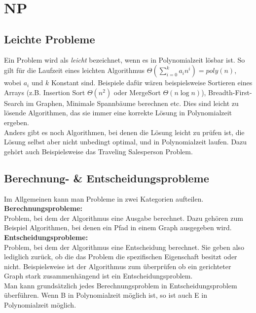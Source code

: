 \documentclass[
../../AuD-Zusammenfassung.tex,
]
{subfiles}
\begin{document}
\section{NP}
\subsection{Leichte Probleme}
Ein Problem wird als \textit{leicht} bezeichnet, wenn es in Polynomialzeit lösbar ist. So gilt für die Laufzeit eines leichten Algorithmus $\Theta(\sum_{i=0}^{k} a_in^i) = poly(n)$, wobei $a_i$ und $k$ Konstant sind. Beispiele dafür wären beispielsweise Sortieren eines Arrays (z.B. Insertion Sort $\Theta(n^2)$ oder MergeSort $\Theta(n \log n)$), Breadth-First-Search im Graphen, Minimale Spannbäume berechnen etc. Dies sind leicht zu lösende Algorithmen, das sie immer eine korrekte Lösung in Polynomialzeit ergeben. \\
Anders gibt es noch Algorithmen, bei denen die Lösung leicht zu prüfen ist, die Lösung selbst aber nicht unbedingt optimal, und in Polynomialzeit laufen. Dazu gehört auch Beispielsweise das Traveling Salesperson Problem.
\subsection{Berechnung- \& Entscheidungsprobleme}
Im Allgemeinen kann man Probleme in zwei Kategorien aufteilen. \\
\textbf{Berechnungsprobleme:}\\
Problem, bei dem der Algorithmus eine Ausgabe berechnet. Dazu gehören zum Beispiel Algorithmen, bei denen ein Pfad in einem Graph ausgegeben wird. \\
\textbf{Entscheidungsprobleme:}\\
Problem, bei dem der Algorithmus eine Entscheidung berechnet. Sie geben also lediglich zurück, ob die das Problem die spezifischen Eigenschaft besitzt oder nicht. Beispielsweise ist der Algorithmus zum überprüfen ob ein gerichteter Graph stark zusammenhängend ist ein Entscheidungsproblem.\\
Man kann grundsätzlich jedes Berechnungsproblem in Entscheidungsproblem überführen. Wenn B in Polynomialzeit möglich ist, so ist auch E in Polynomialzeit möglich.\\
\end{document}
